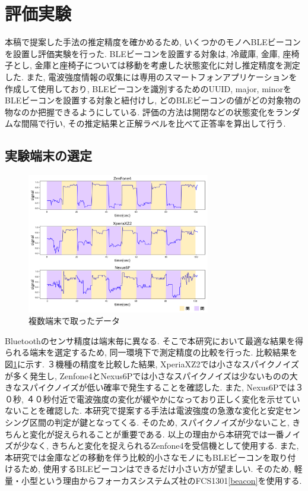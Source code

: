 \documentclass[Japanese]{dicomopapers}
\begin{document}


\section{評価実験}

本稿で提案した手法の推定精度を確かめるため, いくつかのモノへBLEビーコンを設置し評価実験を行った.
BLEビーコンを設置する対象は, 冷蔵庫, 金庫, 座椅子とし, 金庫と座椅子については移動を考慮した状態変化に対し推定精度を測定した.
また, 電波強度情報の収集には専用のスマートフォンアプリケーションを作成して使用しており, BLEビーコンを識別するためのUUID, major, minorをBLEビーコンを設置する対象と紐付けし, どのBLEビーコンの値がどの対象物の物なのか把握できるようにしている.
評価の方法は開閉などの状態変化をランダムな間隔で行い, その推定結果と正解ラベルを比べて正答率を算出して行う.

\subsection{実験端末の選定}

\begin{figure}[ht]
    \centering
    \includegraphics[width=8cm]{mix.png}
    \caption{複数端末で取ったデータ}
    \label{multi-data}
\end{figure}

Bluetoothのセンサ精度は端末毎に異なる.
そこで本研究において最適な結果を得られる端末を選定するため, 同一環境下で測定精度の比較を行った.
比較結果を図\ref{multi-data}に示す.
３機種の精度を比較した結果, XperiaXZ2では小さなスパイクノイズが多く発生し, Zenfone4とNexus6Pでは小さなスパイクノイズは少ないものの大きなスパイクノイズが低い確率で発生することを確認した.
また, Nexus6Pでは３０秒, ４０秒付近で電波強度の変化が緩やかになっており正しく変化を示せていないことを確認した.
本研究で提案する手法は電波強度の急激な変化と安定センシング区間の判定が鍵となってくる.
そのため, スパイクノイズが少ないこと, きちんと変化が捉えられることが重要である.
以上の理由から本研究では一番ノイズが少なく, きちんと変化を捉えられるZenfone4を受信機として使用する.
また, 本研究では金庫などの移動を伴う比較的小さなモノにもBLEビーコンを取り付けるため, 使用するBLEビーコンはできるだけ小さい方が望ましい.
そのため, 軽量・小型という理由からフォーカスシステムズ社のFCS1301\ref{beacon}を使用する.
\end{document}
